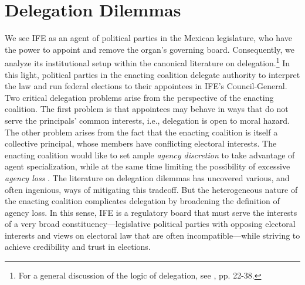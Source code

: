 \documentclass[12 pt, letter]{article}
\begin{document}
\section{Delegation Dilemmas}\label{S:delegation}

We see IFE as an agent of political parties in the Mexican
legislature, who have the power to appoint and remove the organ's
governing board. Consequently, we analyze its institutional setup
within the canonical literature on delegation.\footnote{For a
general discussion of the logic of delegation, see
\citet{Kiewiet1991}, pp. 22-38.}  In this light, political parties
in the enacting coalition delegate authority to interpret the law
and run federal elections to their appointees in IFE's
Council-General.  Two critical delegation problems arise from the
perspective of the enacting coalition.   The first problem is that
appointees may behave in ways that do not serve the principals'
common interests, i.e., delegation is open to moral hazard. The
other problem arises from the fact that the enacting coalition is
itself a collective principal, whose members have conflicting
electoral interests. The enacting coalition would like to set ample
\emph{agency discretion} to take advantage of agent specialization,
while at the same time limiting the possibility of excessive
\emph{agency loss} \citep{Madison1788, McCubbins1987, Huber2002,
Miller2005}.  The literature on delegation dilemmas has uncovered
various, and often ingenious, ways of mitigating this tradeoff.  But
the heterogeneous nature of the enacting coalition complicates
delegation by broadening the definition of agency loss.  In this
sense, IFE is a regulatory board that must serve the interests of a
very broad constituency---legislative political parties with
opposing electoral interests and views on electoral law that are
often incompatible---while striving to achieve credibility and trust
in elections.
\end{document}
